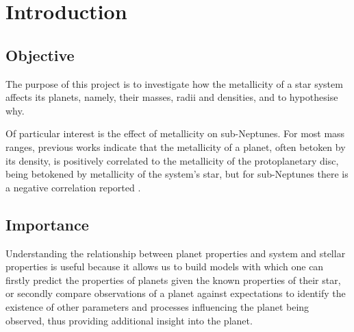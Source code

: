 \documentclass[a4paper,twocolumn,12pt]{article}
\begin{document}

\section{Introduction}

\label{section: Introduction}
\subsection{Objective}
\label{subsection: Objective}
The purpose of this project is to investigate how the metallicity of a star system affects its planets, namely, their masses, radii and densities, and to hypothesise why.



Of particular interest is the effect of metallicity on sub-Neptunes. For most mass ranges, previous works indicate that the metallicity of a planet, often betoken by its density, is positively correlated to the metallicity of the protoplanetary disc, being betokened by metallicity of the system's star, but for sub-Neptunes there is a negative correlation reported \cite{Wilson}.

\subsection{Importance}
\label{subsection: Importance}
Understanding the relationship between planet properties and system and stellar properties is useful because it allows us to build models with which one can firstly predict the properties of planets given the known properties of their star, or secondly compare observations of a planet against expectations to identify the existence of other parameters and processes influencing the planet being observed, thus providing additional insight into the planet. %
\end{document}
